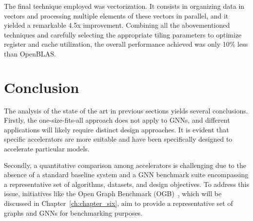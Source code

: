 The final technique employed was vectorization.
It consists in organizing data in vectors and processing multiple elements of these vectors in parallel, and it yielded a remarkable 4.5x improvement.
Combining all the abovementioned techniques and carefully selecting the appropriate tiling parameters to optimize register and cache utilization, the overall performance achieved was only 10\% less than OpenBLAS.

\section{Conclusion}
\label{sec:relater-work-conclusion}

The analysis of the state of the art in previous sections yields several conclusions.
Firstly, the one-size-fits-all approach does not apply to GNNs, and different applications will likely require distinct design approaches.
It is evident that specific accelerators are more suitable and have been specifically designed to accelerate particular models.

Secondly, a quantitative comparison among accelerators is challenging due to the absence of a standard baseline system and a GNN benchmark suite encompassing a representative set of algorithms, datasets, and design objectives.
To address this issue, initiatives like the Open Graph Benchmark (OGB)~\cite{NEURIPS2020_fb60d411}, which will be discussed in Chapter~\ref{ch:chapter_six}, aim to provide a representative set of graphs and GNNs for benchmarking purposes.




